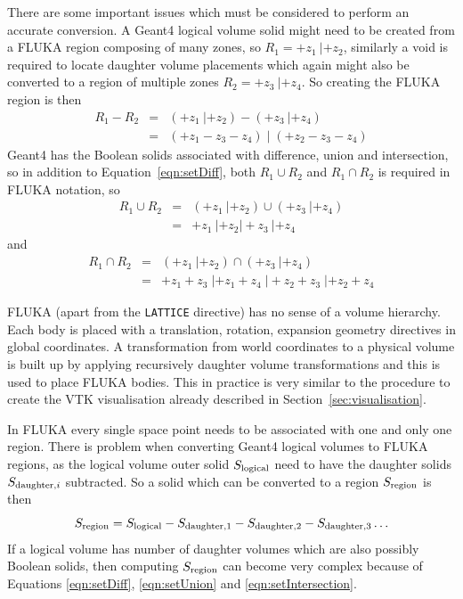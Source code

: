\documentclass[final,5p,times,twocolumn]{elsarticle}
\newcommand{\fluka}[1]{\texttt{\MakeUppercase{#1}}}
\begin{document}
There are some important issues which must be considered to perform an accurate conversion. 
A Geant4 logical volume solid might need to be created from a FLUKA region composing of many zones, 
so $R_1 = +z_1\: | +z_2$, similarly a void is required to locate daughter volume placements which again 
might also be converted to a region of multiple zones $R_2= +z_3 \: | +z_4$. So creating the FLUKA region is then 
\begin{eqnarray}
R_1 - R_2 	& = & (+z_1 \: | +z_2) - ( +z_3 \: | +z_4) 			\\
			& = & (+z_1 - z_3 - z_4) \;  | \; (+z_2 - z_3 - z_4)	
\label{eqn:setDiff}
\end{eqnarray}
Geant4 has the Boolean solids associated with difference, union and intersection, so in addition to 
Equation~\ref{eqn:setDiff}, both $R_1 \cup R_2$ and $R_1 \cap R_2$ is required in FLUKA notation, so 
\begin{eqnarray}
R_1 \cup R_2 	& = & (+z_1 \: | +z_2)  \cup ( +z_3 \: | +z_4) \\
			& = & +z_1 \: | +z_2 |  +z_3 \: | +z_4
\label{eqn:setUnion}
\end{eqnarray}
and 
\begin{eqnarray}
R_1 \cap R_2 	& = & (+z_1 \: | +z_2) \cap ( +z_3 \: | +z_4) \\
			& = & +z_1 +z_3  \; | +z_1 +z_4 \; | +z_2 +z_3 \; | +z_2 +z_4
\label{eqn:setIntersection}
\end{eqnarray}

FLUKA (apart from the \fluka{lattice} directive) has no sense of a volume hierarchy. Each body is placed with a 
translation, rotation, expansion geometry directives in global coordinates. A transformation from world 
coordinates to a physical volume is built up by applying recursively daughter volume transformations 
and  this is used to place FLUKA bodies. This  in practice is very similar to the procedure to create the 
VTK visualisation already described in Section~\ref{sec:visualisation}.

In FLUKA every single space point needs to be associated with one and only one region. There is problem 
when converting Geant4 logical volumes to FLUKA regions, as the logical volume outer solid $S_{\rm logical}$ 
need to have the daughter  solids $S_{{\rm daughter},i}$ subtracted. So a solid which can be converted 
to a region $S_{\rm region}$ is then 
\begin{equation}
S_{\rm region} =  S_{\rm logical} - S_{\rm daughter,1} - S_{\rm daughter,2} - S_{\rm daughter,3} \ldots 
\label{eqn:logicalSubtraction}
\end{equation} 
If a logical volume has  number of daughter volumes which are also possibly Boolean solids, then computing 
$S_{\rm region}$ can become very complex because of Equations \ref{eqn:setDiff}, \ref{eqn:setUnion} and 
\ref{eqn:setIntersection}. 
\end{document}
